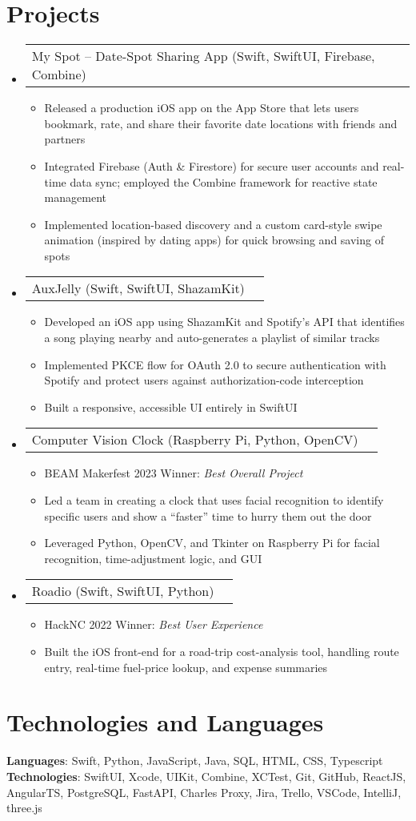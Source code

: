 \documentclass[letterpaper,11pt]{article}
\makeatletter
\newcommand{\resumeItem}[1]{
  \item\small{{#1}}
}
\newcommand{\resumeProjectHeading}[2]{
    \item
    \begin{tabular*}{0.97\textwidth}{l@{\extracolsep{\fill}}r}
      \small#1 & #2 \\
    \end{tabular*}\vspace{-7pt}
}
\newcommand{\resumeSubHeadingListStart}{\begin{itemize}[leftmargin=0.15in, label={}]}
\newcommand{\resumeSubHeadingListEnd}{\end{itemize}}
\newcommand{\resumeItemListStart}{\begin{itemize}}
\newcommand{\resumeItemListEnd}{\end{itemize}\vspace{-5pt}}
\makeatother
\begin{document}
\section{Projects}
  \resumeSubHeadingListStart
    \resumeProjectHeading{My Spot – Date-Spot Sharing App (Swift, SwiftUI, Firebase, Combine)}{}
      \resumeItemListStart
        \resumeItem{Released a production iOS app on the App Store that lets users bookmark, rate, and share their favorite date locations with friends and partners}
        \resumeItem{Integrated Firebase (Auth \& Firestore) for secure user accounts and real-time data sync; employed the Combine framework for reactive state management}
        \resumeItem{Implemented location-based discovery and a custom card-style swipe animation (inspired by dating apps) for quick browsing and saving of spots}
      \resumeItemListEnd
    \resumeProjectHeading{AuxJelly (Swift, SwiftUI, ShazamKit)}{}
      \resumeItemListStart
        \resumeItem{Developed an iOS app using ShazamKit and Spotify’s API that identifies a song playing nearby and auto-generates a playlist of similar tracks}
        \resumeItem{Implemented PKCE flow for OAuth 2.0 to secure authentication with Spotify and protect users against authorization-code interception}
        \resumeItem{Built a responsive, accessible UI entirely in SwiftUI}
      \resumeItemListEnd
    \resumeProjectHeading{Computer Vision Clock (Raspberry Pi, Python, OpenCV)}{}
      \resumeItemListStart
        \resumeItem{BEAM Makerfest 2023 Winner: \emph{Best Overall Project}}
        \resumeItem{Led a team in creating a clock that uses facial recognition to identify specific users and show a “faster” time to hurry them out the door}
        \resumeItem{Leveraged Python, OpenCV, and Tkinter on Raspberry Pi for facial recognition, time-adjustment logic, and GUI}
      \resumeItemListEnd
    \resumeProjectHeading{Roadio (Swift, SwiftUI, Python)}{}
      \resumeItemListStart
        \resumeItem{HackNC 2022 Winner: \emph{Best User Experience}}
        \resumeItem{Built the iOS front-end for a road-trip cost-analysis tool, handling route entry, real-time fuel-price lookup, and expense summaries}
      \resumeItemListEnd
  \resumeSubHeadingListEnd

\section{Technologies and Languages}
  \begin{itemize}[leftmargin=0.15in, label={}]
    \small{\item{
      \textbf{Languages}{: Swift, Python, JavaScript, Java, SQL, HTML, CSS, Typescript} \\
      \textbf{Technologies}{: SwiftUI, Xcode, UIKit, Combine, XCTest, Git, GitHub, ReactJS, AngularTS, PostgreSQL, FastAPI, Charles Proxy, Jira, Trello, VSCode, IntelliJ, three.js}
    }}
  \end{itemize}

\end{document}
